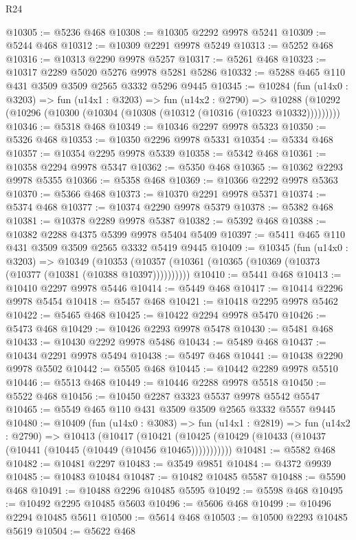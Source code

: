 \begin{lexlean}{R24}
\begin{coremodule}
@10305 := @5236 @468
@10308 := @10305 @2292 @9978 @5241
@10309 := @5244 @468
@10312 := @10309 @2291 @9978 @5249
@10313 := @5252 @468
@10316 := @10313 @2290 @9978 @5257
@10317 := @5261 @468
@10323 := @10317 @2289 @5020 @5276 @9978 @5281 @5286
@10332 := @5288 @465 @110 @431 @3509 @3509 @2565 @3332 @5296 @9445
@10345 := @10284
    (fun (u14x0 : @3203) =>
    fun (u14x1 : @3203) =>
    fun (u14x2 : @2790) =>
    @10288 (@10292 (@10296 (@10300 (@10304 (@10308 (@10312 (@10316 (@10323 @10332)))))))))
@10346 := @5318 @468
@10349 := @10346 @2297 @9978 @5323
@10350 := @5326 @468
@10353 := @10350 @2296 @9978 @5331
@10354 := @5334 @468
@10357 := @10354 @2295 @9978 @5339
@10358 := @5342 @468
@10361 := @10358 @2294 @9978 @5347
@10362 := @5350 @468
@10365 := @10362 @2293 @9978 @5355
@10366 := @5358 @468
@10369 := @10366 @2292 @9978 @5363
@10370 := @5366 @468
@10373 := @10370 @2291 @9978 @5371
@10374 := @5374 @468
@10377 := @10374 @2290 @9978 @5379
@10378 := @5382 @468
@10381 := @10378 @2289 @9978 @5387
@10382 := @5392 @468
@10388 := @10382 @2288 @4375 @5399 @9978 @5404 @5409
@10397 := @5411 @465 @110 @431 @3509 @3509 @2565 @3332 @5419 @9445
@10409 := @10345
    (fun (u14x0 : @3203) =>
    @10349 (@10353 (@10357 (@10361 (@10365 (@10369 (@10373 (@10377 (@10381 (@10388 @10397))))))))))
@10410 := @5441 @468
@10413 := @10410 @2297 @9978 @5446
@10414 := @5449 @468
@10417 := @10414 @2296 @9978 @5454
@10418 := @5457 @468
@10421 := @10418 @2295 @9978 @5462
@10422 := @5465 @468
@10425 := @10422 @2294 @9978 @5470
@10426 := @5473 @468
@10429 := @10426 @2293 @9978 @5478
@10430 := @5481 @468
@10433 := @10430 @2292 @9978 @5486
@10434 := @5489 @468
@10437 := @10434 @2291 @9978 @5494
@10438 := @5497 @468
@10441 := @10438 @2290 @9978 @5502
@10442 := @5505 @468
@10445 := @10442 @2289 @9978 @5510
@10446 := @5513 @468
@10449 := @10446 @2288 @9978 @5518
@10450 := @5522 @468
@10456 := @10450 @2287 @3323 @5537 @9978 @5542 @5547
@10465 := @5549 @465 @110 @431 @3509 @3509 @2565 @3332 @5557 @9445
@10480 := @10409
    (fun (u14x0 : @3083) =>
    fun (u14x1 : @2819) =>
    fun (u14x2 : @2790) =>
    @10413
      (@10417
        (@10421 (@10425 (@10429 (@10433 (@10437 (@10441 (@10445 (@10449 (@10456 @10465)))))))))))
@10481 := @5582 @468
@10482 := @10481 @2297
@10483 := @3549 @9851
@10484 := @4372 @9939
@10485 := @10483 @10484
@10487 := @10482 @10485 @5587
@10488 := @5590 @468
@10491 := @10488 @2296 @10485 @5595
@10492 := @5598 @468
@10495 := @10492 @2295 @10485 @5603
@10496 := @5606 @468
@10499 := @10496 @2294 @10485 @5611
@10500 := @5614 @468
@10503 := @10500 @2293 @10485 @5619
@10504 := @5622 @468

\end{coremodule}
\end{lexlean}
